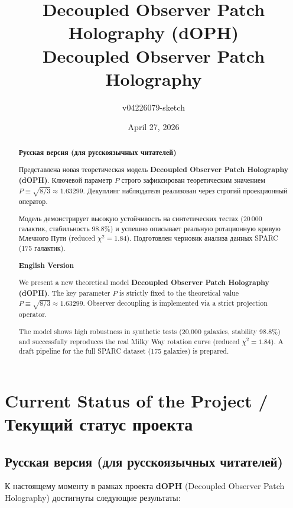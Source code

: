 \documentclass[11pt,a4paper]{article}
\title{Decoupled Observer Patch Holography (dOPH)\\ 
       \large Decoupled Observer Patch Holography}
\author{v04226079-sketch}
\date{April 27, 2026}
\begin{document}
\maketitle

\begin{abstract}
\textbf{Русская версия (для русскоязычных читателей)}

Представлена новая теоретическая модель \textbf{Decoupled Observer Patch Holography (dOPH)}. Ключевой параметр $P$ строго зафиксирован теоретическим значением $P \equiv \sqrt{8/3} \approx 1.63299$. Декуплинг наблюдателя реализован через строгий проекционный оператор. 

Модель демонстрирует высокую устойчивость на синтетических тестах (20\,000 галактик, стабильность 98.8\%) и успешно описывает реальную ротационную кривую Млечного Пути (reduced $\chi^2 = 1.84$). Подготовлен черновик анализа данных SPARC (175 галактик).

\vspace{1em}
\textbf{English Version}

We present a new theoretical model \textbf{Decoupled Observer Patch Holography (dOPH)}. The key parameter $P$ is strictly fixed to the theoretical value $P \equiv \sqrt{8/3} \approx 1.63299$. Observer decoupling is implemented via a strict projection operator.

The model shows high robustness in synthetic tests (20,000 galaxies, stability 98.8\%) and successfully reproduces the real Milky Way rotation curve (reduced $\chi^2 = 1.84$). A draft pipeline for the full SPARC dataset (175 galaxies) is prepared.
\end{abstract}

\section{Current Status of the Project / Текущий статус проекта}

\subsection{Русская версия (для русскоязычных читателей)}

К настоящему моменту в рамках проекта \textbf{dOPH} (Decoupled Observer Patch Holography) достигнуты следующие результаты:
\end{document}
